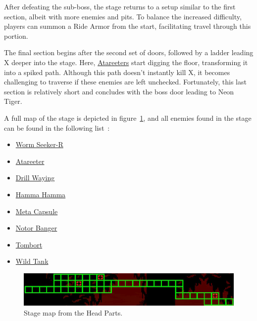 After defeating the sub-boss, the stage returns to a setup similar to the first section, albeit with more enemies and pits. To balance the increased difficulty, players can summon a Ride Armor from the start, facilitating travel through this portion.

The final section begins after the second set of doors, followed by a ladder leading X deeper into the stage. Here, \hyperlink{enem:Atareeter}{Atareeters} start digging the floor, transforming it into a spiked path. Although this path doesn't instantly kill X, it becomes challenging to traverse if these enemies are left unchecked. Fortunately, this last section is relatively short and concludes with the boss door leading to Neon Tiger.

A full map of the stage is depicted in figure~\ref{fig:Safari_map}, and all enemies found in the stage can be found in the following list~\cite{wiki:safari}:

\begin{itemize}
	\item \hyperlink{miniboss:Worm_seeker-r}{Worm Seeker-R}
	\item \hyperlink{enem:Atareeter}{Atareeter}
	\item \hyperlink{enem:Drill_Waying}{Drill Waying}
	\item \hyperlink{enem:Hamma_Hamma}{Hamma Hamma}
	\item \hyperlink{enem:Meta_Capsule}{Meta Capsule}
	\item \hyperlink{enem:Notor_Banger}{Notor Banger}
	\item \hyperlink{enem:Tombort}{Tombort}
	\item \hyperlink{enem:Wild_Tank}{Wild Tank}
\end{itemize}

\begin{figure}[htp]
	\centering
	\includegraphics[width=.7\linewidth]{figures/X3/Neon_tiger/map.jpg}
	\caption{Stage map from the Head Parts.}
	\label{fig:Safari_map}
\end{figure}

